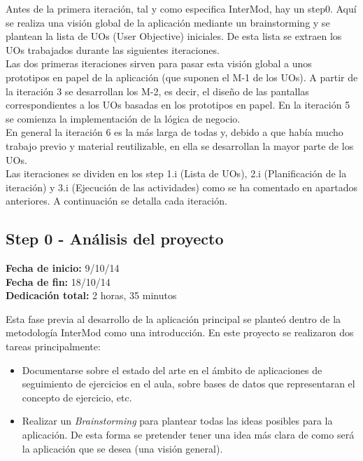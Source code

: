 Antes de la primera iteración, tal y como especifica InterMod, hay un step0. Aquí se realiza una visión global de la aplicación mediante un brainstorming y se plantean la lista de UOs (User Objective) iniciales. De esta lista se extraen los UOs trabajados durante las siguientes iteraciones.\\

Las dos primeras iteraciones sirven para pasar esta visión global a unos prototipos en papel de la aplicación (que suponen el M-1 de los UOs). A partir de la iteración 3 se desarrollan los M-2, es decir, el diseño de las pantallas correspondientes a los UOs basadas en los prototipos en papel. En la iteración 5 se comienza la implementación de la lógica de negocio.\\

En general la iteración 6 es la más larga de todas y, debido a que había mucho trabajo previo y material reutilizable, en ella se desarrollan la mayor parte de los UOs.\\

Las iteraciones se dividen en los step 1.i (Lista de UOs), 2.i (Planificación de la iteración) y 3.i (Ejecución de las actividades) como se ha comentado en apartados anteriores. A continuación se detalla cada iteración.


\subsection{Step 0 - Análisis del proyecto}
\label{step0}

\begin{flushleft}
\textbf{Fecha de inicio:} 9/10/14\\
\textbf{Fecha de fin:} 18/10/14\\
\textbf{Dedicación total:} 2 horas, 35 minutos\\
\end{flushleft}

Esta fase previa al desarrollo de la aplicación principal se planteó dentro de la metodología InterMod como una introducción. En este proyecto se realizaron dos tareas principalmente:

\begin{itemize}
\item Documentarse sobre el estado del arte en el ámbito de aplicaciones de seguimiento de ejercicios en el aula, sobre bases de datos que representaran el concepto de ejercicio, etc.
\item Realizar un \textit{Brainstorming} para plantear todas las ideas posibles para la aplicación. De esta forma se pretender tener una idea más clara de como será la aplicación que se desea (una visión general).
\end{itemize}

